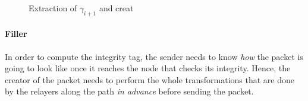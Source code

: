 \begin{figure}[H]
    \caption{Extraction of $\gamma_{i+1}$ and creat}
\end{figure}

\paragraph{Filler}

In order to compute the integrity tag, the sender needs to know \textit{how} the packet is going to look like once it reaches the node that checks its integrity. Hence, the creator of the packet needs to perform the whole transformations that are done by the relayers along the path \textit{in advance} before sending the packet.

